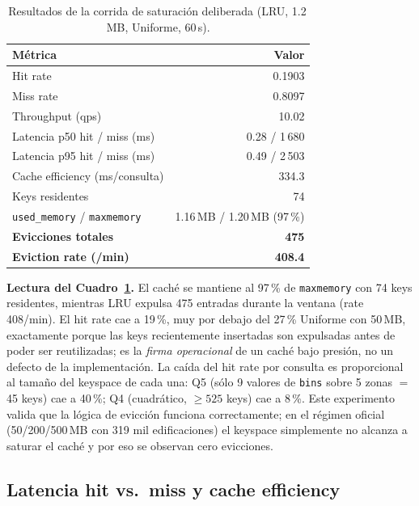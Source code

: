 \documentclass[11pt,a4paper]{article}
\begin{document}
\begin{table}[h]
\centering\small
\setlength{\tabcolsep}{6pt}
\begin{tabular}{lr}
\toprule
\textbf{Métrica} & \textbf{Valor} \\
\midrule
Hit rate                        & 0.1903 \\
Miss rate                       & 0.8097 \\
Throughput (qps)                & 10.02 \\
Latencia p50 hit / miss (ms)    & 0.28 / 1\,680 \\
Latencia p95 hit / miss (ms)    & 0.49 / 2\,503 \\
Cache efficiency (ms/consulta)  & 334.3 \\
Keys residentes                 & 74 \\
\texttt{used\_memory} / \texttt{maxmemory} & 1.16\,MB / 1.20\,MB (97\,\%) \\
\textbf{Evicciones totales}     & \textbf{475} \\
\textbf{Eviction rate (/min)}   & \textbf{408.4} \\
\bottomrule
\end{tabular}
\caption{Resultados de la corrida de saturación deliberada
(LRU, 1.2\,MB, Uniforme, 60\,s).}\label{tab:eviction}
\end{table}

\textbf{Lectura del Cuadro~\ref{tab:eviction}.} El caché se mantiene al
97\,\% de \texttt{maxmemory} con 74 keys residentes, mientras LRU expulsa
475 entradas durante la ventana (rate 408/min). El hit rate cae a 19\,\%,
muy por debajo del 27\,\% Uniforme con 50\,MB, exactamente porque las
keys recientemente insertadas son expulsadas antes de poder ser reutilizadas;
es la \emph{firma operacional} de un caché bajo presión, no un defecto
de la implementación. La caída del hit rate por consulta es proporcional al
tamaño del keyspace de cada una: Q5 (sólo 9 valores de \texttt{bins} sobre
5 zonas $=$ 45 keys) cae a 40\,\%; Q4 (cuadrático, $\geq 525$ keys) cae a
8\,\%. Este experimento valida que la lógica de evicción funciona
correctamente; en el régimen oficial (50/200/500\,MB con 319 mil
edificaciones) el keyspace simplemente no alcanza a saturar el caché y por
eso se observan cero evicciones.

\subsection{Latencia hit vs.\ miss y cache efficiency}
\end{document}
